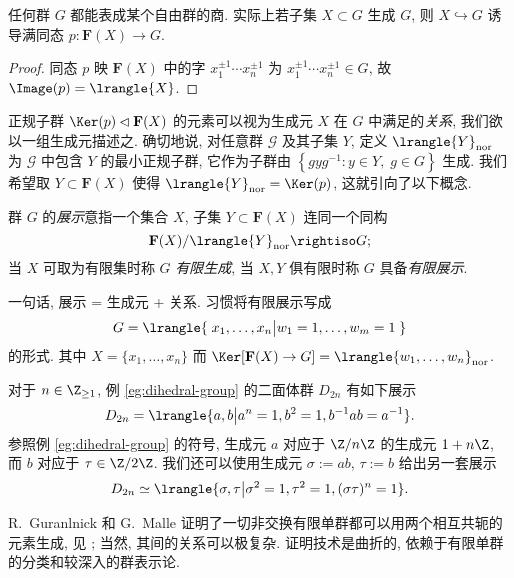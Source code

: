 \begin{proposition}
	任何群 $G$ 都能表成某个自由群的商. 实际上若子集 $X \subset G$ 生成 $G$, 则 $X \hookrightarrow G$ 诱导满同态 $p: \mathbf{F}(X) \to G$.
\end{proposition}
\begin{proof}
	同态 $p$ 映 $\mathbf{F}(X)$ 中的字 $x_1^{\pm 1} \cdots x_n^{\pm 1}$ 为 $x_1^{\pm 1} \cdots x_n^{\pm 1} \in G$, 故 $\Image(p) = \lrangle{X}$.
\end{proof}

正规子群 $\Ker(p) \lhd \mathbf{F}(X)$ 的元素可以视为生成元 $X$ 在 $G$ 中满足的\emph{关系}, 我们欲以一组生成元描述之. 确切地说, 对任意群 $\mathcal{G}$ 及其子集 $Y$, 定义 $\lrangle{Y}_{\text{nor}}$ 为 $\mathcal{G}$ 中包含 $Y$ 的最小正规子群, 它作为子群由 $\left\{ gyg^{-1}: y \in Y, \; g \in G \right\}$ 生成. 我们希望取 $Y \subset \mathbf{F}(X)$ 使得 $\lrangle{Y}_{\text{nor}} = \Ker(p)$, 这就引向了以下概念.

\begin{definition}[群展示]
	群 $G$ 的\emph{展示}意指一个集合 $X$, 子集 $Y \subset \mathbf{F}(X)$ 连同一个同构
	\[ \mathbf{F}(X)/\lrangle{Y}_{\mathrm{nor}} \rightiso G; \]
	当 $X$ 可取为有限集时称 $G$ \emph{有限生成}, 当 $X, Y$ 俱有限时称 $G$ 具备\emph{有限展示}.  
\end{definition}
一句话, 展示 = 生成元 + 关系. 习惯将有限展示写成
\[ G = \lrangle{ \; x_1, \ldots, x_n  \big| w_1=1, \ldots, w_m=1 \; } \]
的形式. 其中 $X = \{x_1, \ldots, x_n\}$ 而 $\Ker[\mathbf{F}(X) \to G] = \lrangle{w_1, \ldots, w_n}_\text{nor}$.

\begin{example}\label{eg:dihedral-presentation}
	对于 $n \in \Z_{\geq 1}$, 例 \ref{eg:dihedral-group} 的二面体群 $D_{2n}$ 有如下展示
	\[ D_{2n} = \lrangle{ a, b \big| a^n=1, b^2=1, b^{-1}ab = a^{-1}  }. \]
	参照例 \ref{eg:dihedral-group} 的符号, 生成元 $a$ 对应于 $\Z/n\Z$ 的生成元 $1+n\Z$, 而 $b$ 对应于 $\tau \in \Z/2\Z$. 我们还可以使用生成元 $\sigma := ab$, $\tau := b$ 给出另一套展示
	\[ D_{2n} \simeq \lrangle{ \sigma, \tau \big| \sigma^2=1, \tau^2 = 1, (\sigma\tau)^n=1}. \]
\end{example}

\begin{example}
	R.\ Guranlnick 和 G.\ Malle 证明了一切非交换有限单群都可以用两个相互共轭的元素生成, 见 \cite[Corollary 8.3]{GM12}; 当然, 其间的关系可以极复杂. 证明技术是曲折的, 依赖于有限单群的分类和较深入的群表示论.
\end{example}

